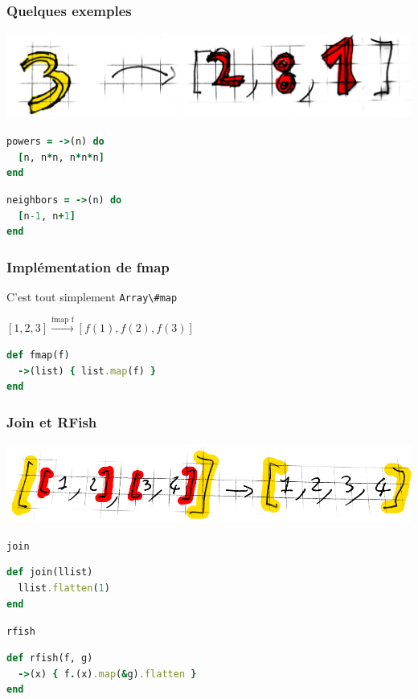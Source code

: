 \documentclass{beamer}
\begin{document}
\begin{frame}[fragile]
  \frametitle{Quelques exemples}
  \begin{center}
    \includegraphics[scale=0.2]{multiple-res.png}
  \end{center}
  \begin{block}{}
    \begin{lstlisting}[language=ruby]
powers = ->(n) do
  [n, n*n, n*n*n]
end
    \end{lstlisting}
  \end{block}
  \begin{block}{}
    \begin{lstlisting}[language=ruby]
neighbors = ->(n) do
  [n-1, n+1]
end
    \end{lstlisting}
  \end{block}
\end{frame}

\begin{frame}[fragile]
  \frametitle{Implémentation de fmap}
  \begin{exampleblock}{C'est tout simplement \verb!Array\#map!}
    \begin{center}
      $[1, 2, 3] {\xrightarrow{\text{fmap f}}} [f(1), f(2), f(3)]$
    \end{center}
  \end{exampleblock}
  \medskip
  \begin{block}{}
    \begin{lstlisting}[language=ruby]
def fmap(f)
  ->(list) { list.map(f) }
end
    \end{lstlisting}  
  \end{block}
\end{frame}

\begin{frame}[fragile]
  \frametitle{Join et RFish}
  \begin{center}
    \includegraphics[scale=0.2]{flatten}
  \end{center}
  \begin{block}{\verb!join!}
    \begin{lstlisting}[language=ruby]
def join(llist)
  llist.flatten(1)
end
    \end{lstlisting}  
  \end{block}
  \begin{block}{\verb!rfish!}
    \begin{lstlisting}[language=ruby]
def rfish(f, g)
  ->(x) { f.(x).map(&g).flatten }
end
    \end{lstlisting}  
  \end{block}
\end{frame}
\end{document}
